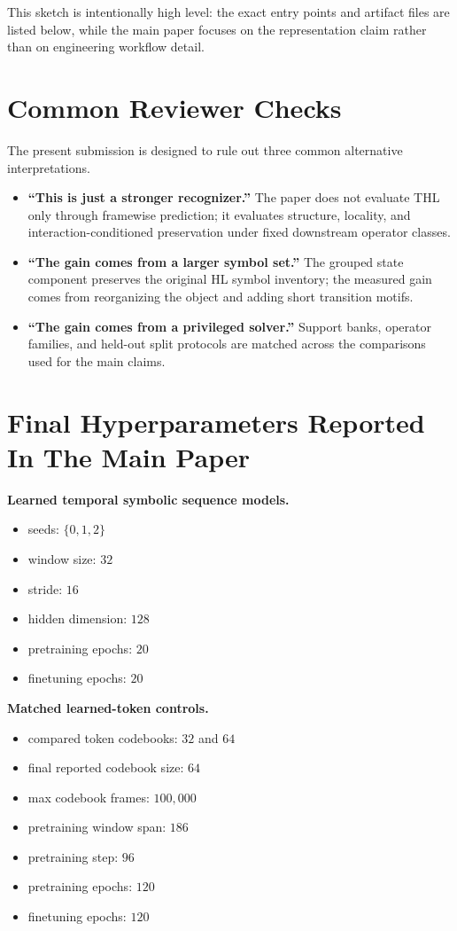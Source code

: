 \documentclass[letterpaper]{article}
\begin{document}
This sketch is intentionally high level: the exact entry points and artifact
files are listed below, while the main paper focuses on the representation claim
rather than on engineering workflow detail.

\section{Common Reviewer Checks}

The present submission is designed to rule out three common alternative
interpretations.
\begin{itemize}
    \item \textbf{``This is just a stronger recognizer.''} The paper does not
    evaluate THL only through framewise prediction; it evaluates structure,
    locality, and interaction-conditioned preservation under fixed downstream
    operator classes.
    \item \textbf{``The gain comes from a larger symbol set.''} The grouped
    state component preserves the original HL symbol inventory; the measured
    gain comes from reorganizing the object and adding short transition motifs.
    \item \textbf{``The gain comes from a privileged solver.''} Support banks,
    operator families, and held-out split protocols are matched across the
    comparisons used for the main claims.
\end{itemize}

\section{Final Hyperparameters Reported In The Main Paper}

\textbf{Learned temporal symbolic sequence models.}
\begin{itemize}
    \item seeds: $\{0,1,2\}$
    \item window size: $32$
    \item stride: $16$
    \item hidden dimension: $128$
    \item pretraining epochs: $20$
    \item finetuning epochs: $20$
\end{itemize}

\textbf{Matched learned-token controls.}
\begin{itemize}
    \item compared token codebooks: $32$ and $64$
    \item final reported codebook size: $64$
    \item max codebook frames: $100{,}000$
    \item pretraining window span: $186$
    \item pretraining step: $96$
    \item pretraining epochs: $120$
    \item finetuning epochs: $120$
\end{itemize}
\end{document}
